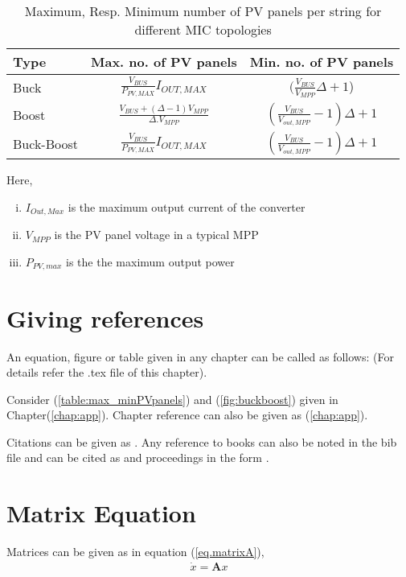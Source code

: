 \begin{table}[h]
	\centering
		\begin{center}
		\centering
		\caption{Maximum, Resp. Minimum number of PV panels per string for different MIC topologies} \label{table:max_minPVpanels}
		\end{center}
	\centering
	\begin{tabular}{l|c|c}
	\hline \rule[-2ex]{0pt}{5.5ex} Type & Max. no. of PV panels & Min. no. of PV panels \\ \hline 
	\hline \rule[-2ex]{0pt}{5.5ex} 
   	    Buck &$\frac{V_{BUS}}{P_{PV,MAX}}I_{OUT,MAX}$  & $(\frac{V_{BUS}}{V_{MPP}}\Delta +1$) \\ 
	\hline \rule[-2ex]{0pt}{5.5ex} 
	    Boost &$\frac{V_{BUS}+(\Delta-1)V_{MPP}}{\Delta.V_{MPP}}$  &$(\frac{V_{BUS}}{V_{out,MPP}}-1)\Delta+1$  \\ 
	\hline \rule[-2ex]{0pt}{5.5ex} 
	   Buck-Boost &$\frac{V_{BUS}}{P_{PV,MAX}}I_{OUT,MAX}$  & $(\frac{V_{BUS}}{V_{out,MPP}}-1)\Delta+1$ \\ 
	\hline 
	\end{tabular} 
\end{table}

Here, 
\begin{enumerate}[(i)]
	\item $I_{Out,Max}$ is the maximum output current of the converter
	\item $V_{MPP}$ is the PV panel voltage in a typical MPP
	\item $P_{PV,max}$ is the the maximum output power
\end{enumerate}



\section{Giving references}
An equation, figure or table given in any chapter can be called as follows: (For details refer the .tex file of this chapter). 

Consider (\autoref{table:max_minPVpanels}) and (\autoref{fig:buckboost}) given in Chapter(\ref{chap:app}). Chapter reference can also be 
given as (\autoref{chap:app}). 

Citations can be given as \cite{a2}. Any reference to books can also be noted in the bib file and can be cited as \cite{b1} and proceedings in the form \cite{p1}.


\section{Matrix Equation}
Matrices can be given as in equation (\ref{eq.matrixA}),
\begin{eqnarray}
	\dot x = \mathbf Ax \label{eq.stateeqn}
\end{eqnarray}

